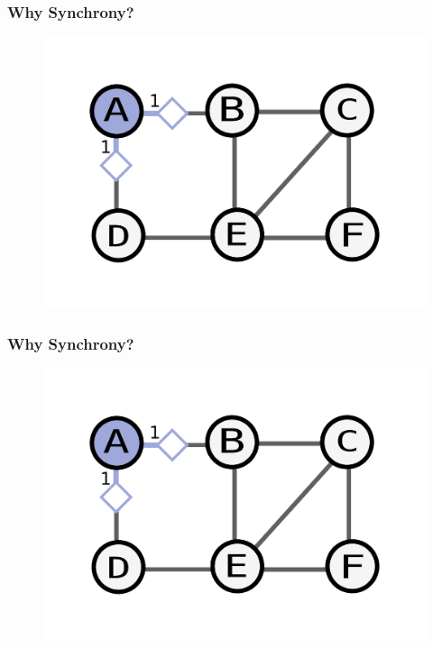 \documentclass{beamer}
\begin{document}
\begin{frame}
    \frametitle{Why Synchrony?}
    \begin{figure}
    \includegraphics[width=0.5\paperwidth]{round1.pdf}
    \end{figure}
\end{frame}

\begin{frame}
    \frametitle{Why Synchrony?}
    \begin{figure}
    \includegraphics[width=0.5\paperwidth]{round1.pdf}
    \end{figure}
\end{frame}
\end{document}
